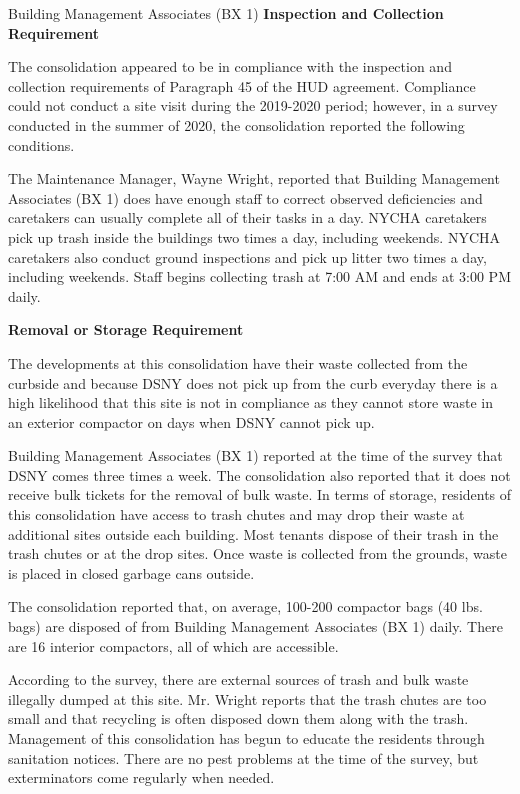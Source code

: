 Building Management Associates (BX 1)
\textbf{Inspection and Collection Requirement}

The consolidation appeared to be in compliance with the inspection and collection requirements of Paragraph 45 of the HUD agreement. Compliance could not conduct a site visit during the 2019-2020 period; however, in a survey conducted in the summer of 2020, the consolidation reported the following conditions.

The Maintenance Manager, Wayne Wright, reported that Building Management Associates (BX 1) does have enough staff to correct observed deficiencies and caretakers can usually complete all of their tasks in a day. NYCHA caretakers pick up trash inside the buildings two times a day, including weekends. NYCHA caretakers also conduct ground inspections and pick up litter two times a day, including weekends. Staff begins collecting trash at 7:00 AM and ends at 3:00 PM daily. 

\textbf{Removal or Storage Requirement}

The developments at this consolidation have their waste collected from the curbside and because DSNY does not pick up from the curb everyday there is a high likelihood that this site is not in compliance as they cannot store waste in an exterior compactor on days when DSNY cannot pick up.

Building Management Associates (BX 1) reported at the time of the survey that DSNY comes three times a week. The consolidation also reported that it does not receive bulk tickets for the removal of bulk waste. In terms of storage, residents of this consolidation have access to trash chutes and may drop their waste at additional sites outside each building. Most tenants dispose of their trash in the trash chutes or at the drop sites. Once waste is collected from the grounds, waste is placed in closed garbage cans outside. 

The consolidation reported that, on average, 100-200 compactor bags (40 lbs. bags) are disposed of from Building Management Associates (BX 1) daily. There are 16 interior compactors, all of which are accessible. 

According to the survey, there are external sources of trash and bulk waste illegally dumped at this site. Mr. Wright reports that the trash chutes are too small and that recycling is often disposed down them along with the trash. Management of this consolidation has begun to educate the residents through sanitation notices. There are no pest problems at the time of the survey, but exterminators come regularly when needed.